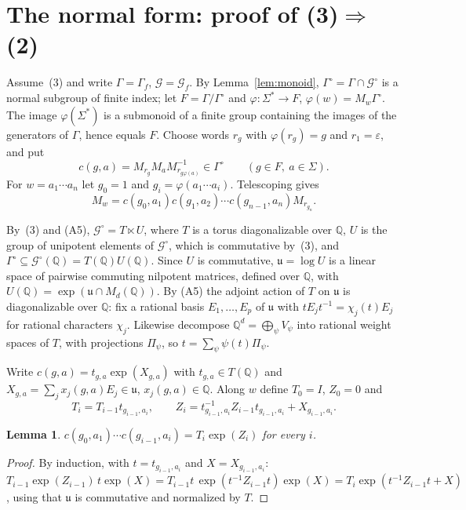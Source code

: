 \documentclass[acmlarge,screen,11pt,nonacm,natbib=false]{acmart}
\newcommand{\Q}{\mathbb{Q}}
\newcommand{\cG}{\mathcal{G}}
\newcommand{\fu}{\mathfrak{u}}
\newcommand{\eps}{\varepsilon}
\newtheorem{lemma}[theorem]{Lemma}
\theoremstyle{definition}
\begin{document}
\section{The normal form: proof of (3)\texorpdfstring{$\Rightarrow$}{=>}(2)}\label{sec:normalform}
Assume~(3) and write $\Gamma=\Gamma_f$, $\cG=\cG_f$. By Lemma~\ref{lem:monoid}, $\Gamma^\circ=\Gamma\cap\cG^\circ$ is a normal subgroup of finite index; let $F=\Gamma/\Gamma^\circ$ and $\varphi:\Sigma^*\to F$, $\varphi(w)=M_w\Gamma^\circ$. The image $\varphi(\Sigma^*)$ is a submonoid of a finite group containing the images of the generators of $\Gamma$, hence equals $F$. Choose words $r_g$ with $\varphi(r_g)=g$ and $r_1=\eps$, and put
\[
c(g,a)=M_{r_g}M_aM_{r_{g\varphi(a)}}^{-1}\in\Gamma^\circ\qquad(g\in F,\ a\in\Sigma).
\]
For $w=a_1\cdots a_n$ let $g_0=1$ and $g_i=\varphi(a_1\cdots a_i)$. Telescoping gives
\begin{equation}\label{eq:cocycle}
M_w=c(g_0,a_1)c(g_1,a_2)\cdots c(g_{n-1},a_n)M_{r_{g_n}}.
\end{equation}

By~(3) and (A5), $\cG^\circ=T\ltimes U$, where $T$ is a torus diagonalizable over $\Q$, $U$ is the group of unipotent elements of $\cG^\circ$, which is commutative by~(3), and $\Gamma^\circ\subseteq\cG^\circ(\Q)=T(\Q)U(\Q)$. Since $U$ is commutative, $\fu=\log U$ is a linear space of pairwise commuting nilpotent matrices, defined over $\Q$, with $U(\Q)=\exp(\fu\cap M_d(\Q))$. By (A5) the adjoint action of $T$ on $\fu$ is diagonalizable over $\Q$: fix a rational basis $E_1,\ldots,E_p$ of $\fu$ with $tE_jt^{-1}=\chi_j(t)E_j$ for rational characters $\chi_j$. Likewise decompose $\Q^d=\bigoplus_\psi V_\psi$ into rational weight spaces of $T$, with projections $\Pi_\psi$, so $t=\sum_\psi\psi(t)\Pi_\psi$.

Write $c(g,a)=t_{g,a}\exp(X_{g,a})$ with $t_{g,a}\in T(\Q)$ and $X_{g,a}=\sum_jx_j(g,a)E_j\in\fu$, $x_j(g,a)\in\Q$. Along $w$ define $T_0=I$, $Z_0=0$ and
\[
T_i=T_{i-1}t_{g_{i-1},a_i},\qquad Z_i=t_{g_{i-1},a_i}^{-1}Z_{i-1}t_{g_{i-1},a_i}+X_{g_{i-1},a_i}.
\]
\begin{lemma}\label{lem:product}
$c(g_0,a_1)\cdots c(g_{i-1},a_i)=T_i\exp(Z_i)$ for every $i$.
\end{lemma}
\begin{proof}
By induction, with $t=t_{g_{i-1},a_i}$ and $X=X_{g_{i-1},a_i}$:
$T_{i-1}\exp(Z_{i-1})\,t\exp(X)=T_{i-1}t\,\exp(t^{-1}Z_{i-1}t)\exp(X)=T_i\exp(t^{-1}Z_{i-1}t+X)$,
using that $\fu$ is commutative and normalized by $T$.
\end{proof}
\end{document}

